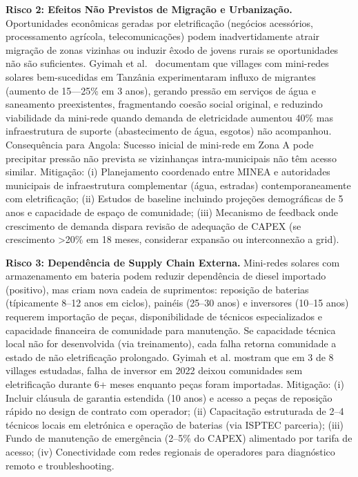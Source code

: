 \documentclass[12pt, a4paper]{article}
\begin{document}
\textbf{Risco 2: Efeitos Não Previstos de Migração e Urbanização.} Oportunidades econômicas geradas por eletrificação (negócios acessórios, processamento agrícola, telecomunicações) podem inadvertidamente atrair migração de zonas vizinhas ou induzir êxodo de jovens rurais se oportunidades não são suficientes. Gyimah et al.~\citep{Gyimah2024} documentam que villages com mini-redes solares bem-sucedidas em Tanzânia experimentaram influxo de migrantes (aumento de 15—25\% em 3 anos), gerando pressão em serviços de água e saneamento preexistentes, fragmentando coesão social original, e reduzindo viabilidade da mini-rede quando demanda de eletricidade aumentou 40\% mas infraestrutura de suporte (abastecimento de água, esgotos) não acompanhou. Consequência para Angola: Sucesso inicial de mini-rede em Zona A pode precipitar pressão não prevista se vizinhanças intra-municipais não têm acesso similar. Mitigação: (i) Planejamento coordenado entre MINEA e autoridades municipais de infraestrutura complementar (água, estradas) contemporaneamente com eletrificação; (ii) Estudos de baseline incluindo projeções demográficas de 5 anos e capacidade de espaço de comunidade; (iii) Mecanismo de feedback onde crescimento de demanda dispara revisão de adequação de CAPEX (se crescimento >20\% em 18 meses, considerar expansão ou interconnexão a grid).

\textbf{Risco 3: Dependência de Supply Chain Externa.} Mini-redes solares com armazenamento em bateria podem reduzir dependência de diesel importado (positivo), mas criam nova cadeia de suprimentos: reposição de baterias (típicamente 8--12 anos em ciclos), painéis (25--30 anos) e inversores (10--15 anos) requerem importação de peças, disponibilidade de técnicos especializados e capacidade financeira de comunidade para manutenção. Se capacidade técnica local não for desenvolvida (via treinamento), cada falha retorna comunidade a estado de não eletrificação prolongado. Gyimah et al. mostram que em 3 de 8 villages estudadas, falha de inversor em 2022 deixou comunidades sem eletrificação durante 6+ meses enquanto peças foram importadas. Mitigação: (i) Incluir cláusula de garantia estendida (10 anos) e acesso a peças de reposição rápido no design de contrato com operador; (ii) Capacitação estruturada de 2--4 técnicos locais em eletrónica e operação de baterias (via ISPTEC parceria); (iii) Fundo de manutenção de emergência (2--5\% do CAPEX) alimentado por tarifa de acesso; (iv) Conectividade com redes regionais de operadores para diagnóstico remoto e troubleshooting.
\end{document}
